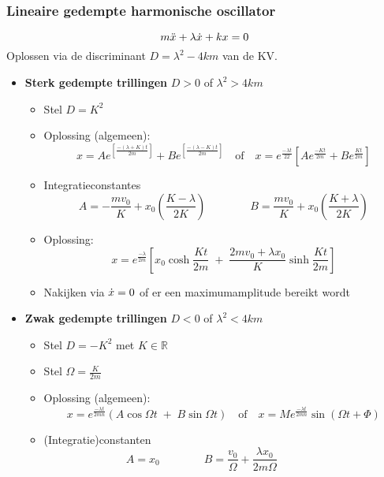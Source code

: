 \subsubsection{Lineaire gedempte harmonische oscillator}
\[
  m\ddot{x} + \lambda\dot{x} + kx  = 0
\]
Oplossen via de discriminant $D = \lambda^2 - 4km$ van de KV.
\begin{itemize}
  \item \textbf{Sterk    gedempte trillingen} $D > 0$ of $\lambda^2 > 4km$
    \begin{itemize}
      \item  Stel $D = K^2$
      \item Oplossing (algemeen):
            \[
              x = A e^{\left[\frac{-\left(\lambda + K\right)t}{2m}\right]} + B e^{\left[\frac{-\left(\lambda - K\right)t}{2m}\right]}  
             \quad \mbox{of} \quad
              x = e^{\frac{-\lambda t}{22}} \left[ A e^{\frac{-Kt}{2m}} + B e^{\frac{Kt}{2m}} \right]
            \]
      \item Integratieconstantes
            \[
              A = - \frac{mv_0}{K} + x_0 \left(\frac{K-\lambda}{2K}\right)
              \qquad \qquad
              B =  \frac{mv_0}{K} + x_0 \left(\frac{K+\lambda}{2K}\right)
            \]
      \item Oplossing:
            \[
              x = e^{\frac{-\lambda}{2m}}\left[ x_0 \cosh \frac{Kt}{2m} \;+\; \frac{2mv_0+\lambda x_0}{K} \sinh \frac{Kt}{2m}  \right]
            \]
      \item Nakijken via $\dot{x} = 0$ of er een maximumamplitude bereikt wordt
    \end{itemize}
  \item \textbf{Zwak gedempte trillingen} $D < 0$ of $\lambda^2 < 4km$
    \begin{itemize}
       \item  Stel $D = - K^2$ met $K \in \mathbb{R}$
       \item  Stel $\Omega = \frac{K}{2m}$
       \item Oplossing (algemeen):
             \[
               x = e^{\frac{-\lambda t}{2mn}} \left( A \cos \Omega t \; + \; B \sin \Omega t\right)
               \quad \mbox{of} \quad
               x = M e^{\frac{-\lambda t}{2mn}} \sin \left( \Omega t + \Phi \right)
             \]
       \item (Integratie)constanten
             \[
               A = x_0 
               \qquad \qquad 
               B = \frac{v_0}{\Omega} + \frac{\lambda x_0}{2m\Omega}
               \qquad \qquad
\]
\end{itemize}
\end{itemize}
